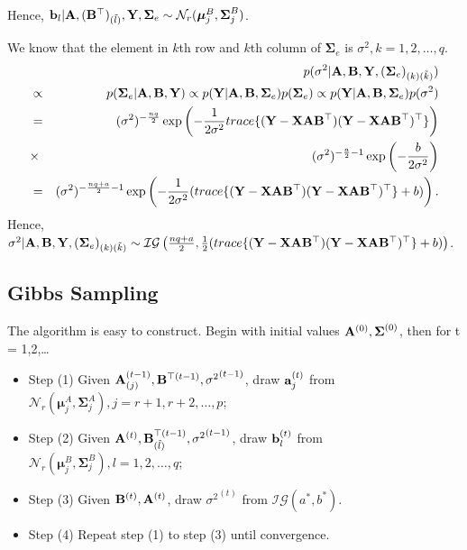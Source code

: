 \documentclass[]{book}
\providecommand{\tightlist}{%
  \setlength{\itemsep}{0pt}\setlength{\parskip}{0pt}}
\begin{document}
Hence, \({\bf b}_l|{\bf A},({\bf B}^{{\top}})_{(\tilde{l})},{\bf Y},{\boldsymbol \Sigma}_e\sim \mathcal{N}_r({\boldsymbol \mu}_j^B,{\boldsymbol \Sigma}_j^B)\).

We know that the element in \(k\)th row and \(k\)th column of \({\boldsymbol \Sigma}_e\) is \(\sigma^2, k=1,2,\ldots,q\).
\begin{eqnarray*}
 &&p(\sigma^2|{\bf A},{\bf B},{\bf Y},({\boldsymbol \Sigma}_e)_{(k)(\tilde{k})})\\
 &\propto& p({\boldsymbol \Sigma}_e|{\bf A},{\bf B},{\bf Y})\propto
 p({\bf Y}|{\bf A},{\bf B},{\boldsymbol \Sigma}_e)p({\boldsymbol \Sigma}_e)\propto p({\bf Y}|{\bf A},{\bf B},{\boldsymbol \Sigma}_e)p(\sigma^2)\\
 &=& (\sigma^2)^{-\frac{nq}{2}}\exp\left(-\frac{1}{2\sigma^2}trace\{
 ({\bf Y}-{\bf X}{\bf A}{\bf B}^{{\top}})({\bf Y}-{\bf X}{\bf A}{\bf B}^{{\top}})^{{\top}}\}\right)\\
 &\times & (\sigma^2)^{-\frac{a}{2}-1}\exp\left(-\frac{b}{2\sigma^2}\right)\\
 &=& (\sigma^2)^{-\frac{nq+a}{2}-1}\exp\left(-\frac{1}{2\sigma^2}(trace\{
 ({\bf Y}-{\bf X}{\bf A}{\bf B}^{{\top}})({\bf Y}-{\bf X}{\bf A}{\bf B}^{{\top}})^{{\top}}\}+b)\right).
\end{eqnarray*}
Hence, \(\sigma^2|{\bf A},{\bf B},{\bf Y},({\boldsymbol \Sigma}_e)_{(k)(\tilde{k})}\sim \mathcal{IG}\left(\frac{nq+a}{2},\frac{1}{2}(trace\{({\bf Y}-{\bf X}{\bf A}{\bf B}^{{\top}})({\bf Y}-{\bf X}{\bf A}{\bf B}^{{\top}})^{{\top}}\}+b)\right)\).

\hypertarget{gibbs-sampling}{%
\subsection{Gibbs Sampling}\label{gibbs-sampling}}

The algorithm is easy to construct. Begin with initial values \({\bf A}^{(0)}, {\boldsymbol \Sigma}^{(0)}\), then for t = 1,2,\ldots{}

\begin{itemize}
\tightlist
\item
  Step (1) Given \({\bf A}_{(j)}^{(t-1)},{\bf B}^{{\top}(t-1)}, {\sigma^2}^{(t-1)}\), draw \({\bf a}_j^{(t)}\) from
  \(\mathcal{N}_r({\boldsymbol \mu}_j^A,{\boldsymbol \Sigma}_j^A),j=r+1,r+2,\ldots,p\);
\item
  Step (2) Given \({\bf A}^{(t)},{\bf B}^{{\top}(t-1)}_{(\tilde{l})}, {\sigma^2}^{(t-1)}\), draw \({\bf b}_l^{(t)}\) from
  \(\mathcal{N}_r({\boldsymbol \mu}_j^B,{\boldsymbol \Sigma}_j^B),l=1,2,\ldots,q\);
\item
  Step (3) Given \({\bf B}^{(t)}, {\bf A}^{(t)}\), draw \({\sigma^2}^{(t)}\) from \(\mathcal{IG}\left(a^*,b^*\right)\).
\item
  Step (4) Repeat step (1) to step (3) until convergence.
\end{itemize}
\end{document}
